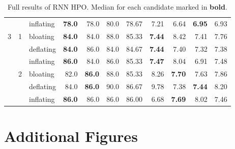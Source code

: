 \begin{table}[H]
{\begin{tabular}{lllrrrrrrrr}
		&   & inflating &          \textbf{78.0} &  78.0 &  80.0 &  78.67 &          7.21 &  6.64 &  \textbf{6.95} &  6.93 \\
		3 & 1 & bloating &          \textbf{84.0} &  84.0 &  88.0 &  85.33 &          \textbf{7.44} &  8.42 &  7.41 &  7.76 \\
		&   & deflating &          \textbf{84.0} &  86.0 &  84.0 &  84.67 &          \textbf{7.44} &  7.40 &  7.32 &  7.38 \\
		&   & inflating &          \textbf{86.0} &  84.0 &  86.0 &  85.33 &          \textbf{7.47} &  8.04 &  6.91 &  7.48 \\
		& 2 & bloating &          82.0 &  \textbf{86.0} &  88.0 &  85.33 &          8.26 &  \textbf{7.70} &  7.63 &  7.86 \\
		&   & deflating &          84.0 &  \textbf{86.0} &  90.0 &  86.67 &          9.78 &  7.38 &  \textbf{7.44} &  8.20 \\
		&   & inflating &          \textbf{86.0} &  86.0 &  86.0 &  86.00 &          6.68 &  \textbf{7.69} &  8.02 &  7.46 \\
		\bottomrule
	\end{tabular}
	}
	\caption{Full results of \gls{RNN} HPO. Median for each candidate marked in \textbf{bold}.}
\end{table}

\pagebreak
\section{Additional Figures}

